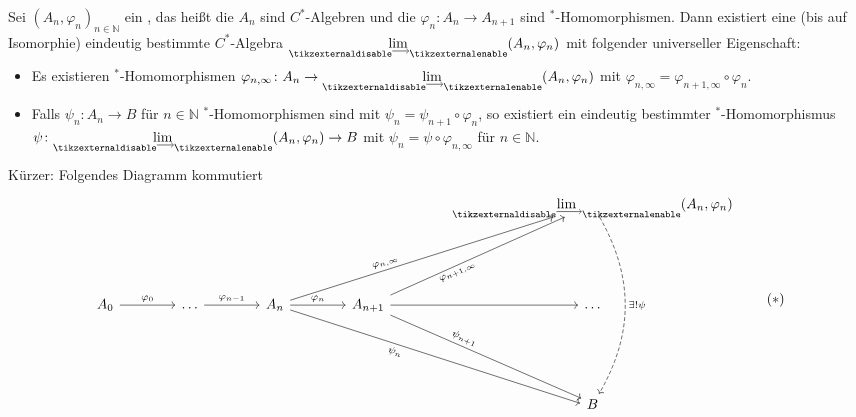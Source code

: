 \begin{satz}[{name=[Limes von C*-Algebren]},label=satz:ger_lim]
	Sei $(A_n,\varphi_n)_{n \in \mathbb{N}}$ ein , das heißt die $A_n$ sind $C^*$-Algebren und die $\varphi_n \colon A_n \to A_{n+1}$ sind $^*$-Homomorphismen.
	Dann existiert eine (bis auf Isomorphie) eindeutig bestimmte $C^*$-Algebra $\Dlim(A_n,\varphi_n)$ mit folgender universeller Eigenschaft:
	\begin{itemize}
		\item Es existieren $^*$-Homomorphismen $\varphi_{n,\infty} \colon A_n \to \Dlim(A_n,\varphi_n)$ mit $\varphi_{n,\infty} = \varphi_{n+1,\infty} \circ \varphi_{n}$.
		\item Falls $\psi_n \colon A_n \to B$ für $n \in \mathbb{N}$ $^*$-Homomorphismen sind mit $\psi_n = \psi_{n+1} \circ \varphi_n$, so existiert ein eindeutig bestimmter $^*$-Homomorphismus $\psi \colon \Dlim(A_n,\varphi_n) \to B$ mit $\psi_n = \psi \circ \varphi_{n,\infty}$ für $n \in \mathbb{N}$.
	\end{itemize}
	Kürzer: Folgendes Diagramm kommutiert
	\begin{equation}
		\begin{tikzcd}[column sep=4em,row sep=5.5em,arrows={sloped,pos=.37}]
			& & & & \displaystyle \Dlim(A_n,\varphi_n) \ar[dd,"\exists! \psi",dashed,sloped=false,pos=.5, bend left] \\
			A_0 \rar["\varphi_0",pos=.5]  & \ldots  \rar["\varphi_{n-1}",pos=.5] %
			& A_n \rar["\varphi_n",pos=.5] \ar[urr,"\varphi_{n,\infty}"] \ar[drr,"\psi_n"',end anchor={[yshift=-0.3ex]}] 
			& A_{n+1} \rar \ar[ur,"\varphi_{n+1,\infty}"'] \ar[dr,"\psi_{n+1}",end anchor={[yshift=0.3ex]}] 
			& \ldots \\
			& & & &  B
		\end{tikzcd} \label{eq:413} \tag{$*$}
	\end{equation}
\end{satz}
